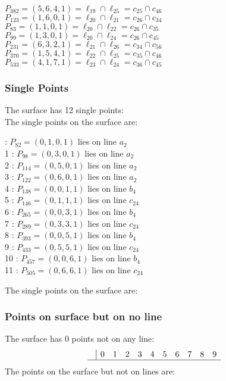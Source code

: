\documentclass{article}
\begin{document}
{\begin{multicols}{2}
$P_{382} = ( 5, 6, 4, 1 ) = \ell_{19} \cap \ell_{25}  = c_{25} \cap c_{46}$\\
$P_{123} = ( 1, 6, 0, 1 ) = \ell_{20} \cap \ell_{21}  = c_{26} \cap c_{34}$\\
$P_{83} = ( 1, 1, 0, 1 ) = \ell_{20} \cap \ell_{22}  = c_{26} \cap c_{35}$\\
$P_{99} = ( 1, 3, 0, 1 ) = \ell_{20} \cap \ell_{24}  = c_{26} \cap c_{45}$\\
$P_{231} = ( 6, 3, 2, 1 ) = \ell_{21} \cap \ell_{26}  = c_{34} \cap c_{56}$\\
$P_{370} = ( 1, 5, 4, 1 ) = \ell_{22} \cap \ell_{25}  = c_{35} \cap c_{46}$\\
$P_{533} = ( 4, 1, 7, 1 ) = \ell_{23} \cap \ell_{24}  = c_{36} \cap c_{45}$\\
\end{multicols}
\subsubsection*{Single Points}
The surface has 12 single points:\\
The single points on the surface are:\\
\begin{multicols}{2}
 : $P_{82}=( 0, 1, 0, 1 )$ lies on line $a_{2}$\\
1 : $P_{98}=( 0, 3, 0, 1 )$ lies on line $a_{2}$\\
2 : $P_{114}=( 0, 5, 0, 1 )$ lies on line $a_{2}$\\
3 : $P_{122}=( 0, 6, 0, 1 )$ lies on line $a_{2}$\\
4 : $P_{138}=( 0, 0, 1, 1 )$ lies on line $b_{4}$\\
5 : $P_{146}=( 0, 1, 1, 1 )$ lies on line $c_{24}$\\
6 : $P_{265}=( 0, 0, 3, 1 )$ lies on line $b_{4}$\\
7 : $P_{289}=( 0, 3, 3, 1 )$ lies on line $c_{24}$\\
8 : $P_{393}=( 0, 0, 5, 1 )$ lies on line $b_{4}$\\
9 : $P_{433}=( 0, 5, 5, 1 )$ lies on line $c_{24}$\\
10 : $P_{457}=( 0, 0, 6, 1 )$ lies on line $b_{4}$\\
11 : $P_{505}=( 0, 6, 6, 1 )$ lies on line $c_{24}$\\
\end{multicols}
The single points on the surface are:\\
\subsubsection*{Points on surface but on no line}
The surface has 0 points not on any line:\\
$$
\begin{array}{r|*{10}{r}}
 & 0 & 1 & 2 & 3 & 4 & 5 & 6 & 7 & 8 & 9\\
\hline
\end{array}
$$
The points on the surface but not on lines are:\\
\begin{multicols}{2}
\noindent
\end{multicols}
}
\end{document}
